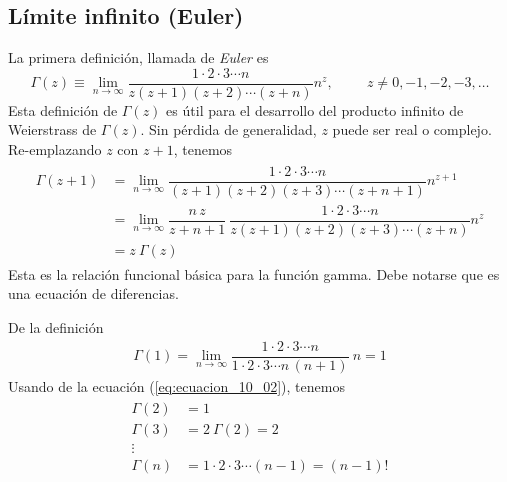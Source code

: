 \subsection{Límite infinito (Euler)}
La primera definición, llamada de \emph{Euler} es
\begin{equation}
\Gamma(z) \equiv \lim_{n \to \infty} \dfrac{1 \cdot 2 \cdot 3 \cdots n}{z (z+1) (z+2) \cdots (z+n)} n^{z}, \hspace{1cm} z \neq 0, -1,-2,-3, \ldots
\label{eq:ecuacion_10_01}
\end{equation}
Esta definición de $\Gamma(z)$ es útil para el desarrollo del producto infinito de Weierstrass de $\Gamma (z)$. Sin pérdida de generalidad, $z$ puede ser real o complejo. Re-emplazando $z$ con $z + 1$, tenemos
\begin{align}
\begin{aligned}
\Gamma (z + 1) &= \lim_{n \to \infty} \dfrac{1 \cdot 2 \cdot 3 \cdots n}{(z + 1)(z + 2)(z + 3) \cdots (z + n + 1)} n^{z + 1} \\
&= \lim_{n \to \infty} \dfrac{n \, z}{z + n + 1} \: \dfrac{1 \cdot 2 \cdot 3 \cdots n}{z (z + 1)(z + 2)(z + 3) \cdots (z + n)} n^{z} \\
&= z \: \Gamma (z)
\label{eq:ecuacion_10_02}
\end{aligned}
\end{align}
Esta es la relación funcional básica para la función gamma. Debe notarse que es una ecuación de diferencias. %
\par
De la definición
\begin{align}
\Gamma (1) = \lim_{n \to \infty} \dfrac{1 \cdot 2 \cdot 3 \cdots n}{1 \cdot 2 \cdot 3 \cdots n \, (n + 1)} \: n = 1
\label{eq:ecuacion_10_03}
\end{align}
Usando de la ecuación (\ref{eq:ecuacion_10_02}), tenemos
\begin{align}
\begin{aligned}
\Gamma (2) &= 1 \\
\Gamma (3) &=  2 \: \Gamma(2) =  2 \\
\vdots \\
\Gamma (n) &= 1 \cdot 2 \cdot 3 \cdots (n-1) =  (n-1)!
\label{eq:ecuacion_10_04}
\end{aligned}
\end{align}
